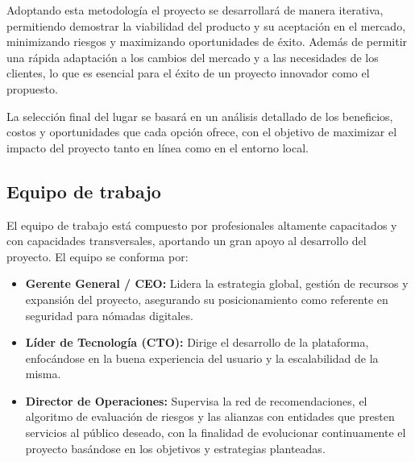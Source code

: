 Adoptando esta metodología el proyecto se desarrollará de manera iterativa, permitiendo demostrar la viabilidad del producto y su aceptación en el mercado, minimizando riesgos y maximizando oportunidades de éxito. Además de permitir una rápida adaptación a los cambios del mercado y a las necesidades de los clientes, lo que es esencial para el éxito de un proyecto innovador como el propuesto.

La selección final del lugar se basará en un análisis detallado de los beneficios, costos y oportunidades que cada opción ofrece, con el objetivo de maximizar el impacto del proyecto tanto en línea como en el entorno local.

\subsection{Equipo de trabajo}
El equipo de trabajo está compuesto por profesionales altamente capacitados y con capacidades transversales, aportando un gran apoyo al desarrollo del proyecto. El equipo se conforma por:
\begin{itemize}
    \item \textbf{Gerente General / CEO:} Lidera la estrategia global, gestión de recursos y expansión del proyecto, asegurando su posicionamiento como referente en seguridad para nómadas digitales.
    
    \item \textbf{Líder de Tecnología (CTO):} Dirige el desarrollo de la plataforma, enfocándose en la buena experiencia del usuario y la escalabilidad de la misma.
    
    \item \textbf{Director de Operaciones:} Supervisa la red de recomendaciones, el algoritmo de evaluación de riesgos y las alianzas con entidades que presten servicios al público deseado, con la finalidad de evolucionar continuamente el proyecto basándose en los objetivos y estrategias planteadas.
\end{itemize}
